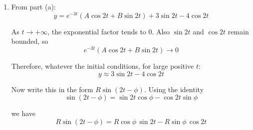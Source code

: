 \documentclass[leqno]{article}
\begin{document}
\begin{enumerate}[
  label=\textbf{\arabic*.},
  leftmargin=*,
  topsep=0pt,
  partopsep=0pt,
  parsep=0pt
]
\begin{djsSolution}
\begin{enumerate}[label=\textbf{(\alph*)}]
  Substituting into the differential equation:
  \begin{align*}
  &\left(-4a\sin 2t-4b\cos 2t\right)+6\left(2a\cos 2t-2b\sin 2t\right)+13\left(a\sin 2t+b\cos 2t\right) \\
  &=75\sin 2t
  \end{align*}

  Collecting $\sin 2t$ and $\cos 2t$ terms:
  \begin{align*}
  &( -4a-12b+13a)\sin 2t+(12a-4b+13b)\cos 2t \\
  &=75\sin 2t
  \end{align*}

  So
  \[
  (9a-12b)\sin 2t+(12a+9b)\cos 2t=75\sin 2t
  \]

  Equating coefficients gives
  \begin{align*}
  9a-12b&=75 \\
  12a+9b&=0
  \end{align*}

  Solve these simultaneously. From the second equation:
  \[
  4a+3b=0\quad\Longrightarrow\quad b=-\frac{4a}{3}
  \]

  Substitute into the first:
  \begin{align*}
  9a-12\left(-\frac{4a}{3}\right)&=75 \\
  9a+16a&=75 \\
  25a&=75 \\
  a&=3
  \end{align*}

  Then
  \[
  b=-\frac{4(3)}{3}=-4
  \]

  Thus
  \[
  y_p=3\sin 2t-4\cos 2t
  \]

  Therefore the general solution is
  \[
  y=e^{-3t}(A\cos 2t+B\sin 2t)+3\sin 2t-4\cos 2t
  \]

  \item From part (a):
  \[
  y=e^{-3t}(A\cos 2t+B\sin 2t)+3\sin 2t-4\cos 2t
  \]

  As $t\to+\infty$, the exponential factor tends to $0$. Also $\sin 2t$ and $\cos 2t$ remain bounded, so
  \[
  e^{-3t}(A\cos 2t+B\sin 2t)\to 0
  \]

  Therefore, whatever the initial conditions, for large positive $t$:
  \[
  y\approx 3\sin 2t-4\cos 2t
  \]

  Now write this in the form $R\sin(2t-\phi)$. Using the identity
  \[
  \sin(2t-\phi)=\sin 2t\cos\phi-\cos 2t\sin\phi
  \]

  we have
  \[
  R\sin(2t-\phi)=R\cos\phi\,\sin 2t-R\sin\phi\,\cos 2t
  \]


\end{enumerate}
\end{djsSolution}
\end{enumerate}
\end{document}
